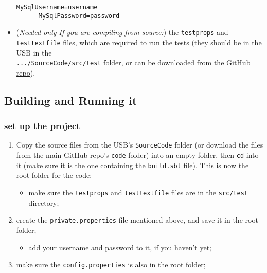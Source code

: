 \begin{itemize}
    \begin{lstlisting}[frame=single]
      MySqlUsername=username
      MySqlPassword=password
    \end{lstlisting}

  \item
    (\emph{Needed only If you are compiling from source:}) the
    \texttt{testprops} and \texttt{testtextfile} files, which are required to
    run the tests (they should be in the USB in the\\
    \texttt{.../SourceCode/src/test} folder, or can be downloaded from
    \href{https://github.com/claudiusbr/personal_finance_system/tree/master/code/src/test}{the
    GitHub repo}).


\end{itemize}

\subsection{Building and Running it}
\subsubsection{set up the project}
\begin{enumerate}
  \item
    Copy the source files from the USB's \texttt{SourceCode} folder (or
    download the files from the main GitHub repo's \texttt{code} folder) into
    an empty folder, then \texttt{cd} into it (make sure it is the one
    containing the \texttt{build.sbt} file). This is now the root folder for
    the code;
    \begin{itemize}
    \item
      make sure the \texttt{testprops} and \texttt{testtextfile} files are in the
      \texttt{src/test} directory;
    \end{itemize}

  \item
    create the \texttt{private.properties} file mentioned above, and save it in
    the root folder;
    \begin{itemize}
      \item
      add your username and password to it, if you haven't yet;
    \end{itemize}

  \item
    make sure the \texttt{config.properties} is also in the root folder;

\end{enumerate}


